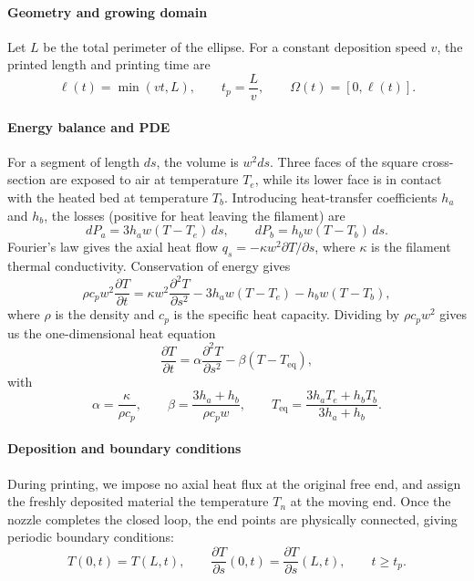 \documentclass[a4paper,12pt]{article}
\begin{document}
\paragraph{Geometry and growing domain}
Let $L$ be the total perimeter of the ellipse. For a constant deposition speed $v$, the printed length and printing time are
\begin{equation}
    \ell(t)=\min(vt,L), \qquad t_p=\frac{L}{v},
    \qquad \Omega(t)=[0,\ell(t)].
\end{equation}


\paragraph{Energy balance and PDE}
For a segment of length $ds$, the volume is $w^2ds$. Three faces of the square cross-section are exposed to air at temperature $T_e$, while its lower face is in contact with the heated bed at temperature $T_b$. Introducing heat-transfer coefficients $h_a$ and $h_b$, the losses (positive for heat leaving the filament) are
\begin{equation}
    dP_a=3h_aw(T-T_e)\,ds,
    \qquad dP_b=h_bw(T-T_b)\,ds.
\end{equation}
Fourier's law gives the axial heat flow $q_s=-\kappa w^2\partial T/\partial s$, where $\kappa$ is the filament thermal conductivity. Conservation of energy gives
\begin{equation}
    \rho c_pw^2\frac{\partial T}{\partial t}
    =\kappa w^2\frac{\partial^2T}{\partial s^2}
    -3h_aw(T-T_e)-h_bw(T-T_b),
\end{equation}
where $\rho$ is the density and $c_p$ is the specific heat capacity. Dividing by $\rho c_pw^2$ gives us the one-dimensional heat equation
\begin{equation}
\boxed{
    \frac{\partial T}{\partial t}
    =\alpha\frac{\partial^2T}{\partial s^2}
    -\beta(T-T_{\mathrm{eq}}),
}
\label{eq:q16pde}
\end{equation}
with
\begin{equation}
    \alpha=\frac{\kappa}{\rho c_p},\qquad
    \beta=\frac{3h_a+h_b}{\rho c_pw},\qquad
    T_{\mathrm{eq}}=\frac{3h_aT_e+h_bT_b}{3h_a+h_b}.
\end{equation}


\paragraph{Deposition and boundary conditions}

During printing, we impose no axial heat flux at the original free end, and assign the freshly deposited material the temperature $T_n$ at the moving end. Once the nozzle completes the closed loop, the end points are physically connected, giving periodic boundary conditions:
\begin{equation}
    T(0,t)=T(L,t),\qquad
    \frac{\partial T}{\partial s}(0,t)
    =\frac{\partial T}{\partial s}(L,t), \qquad t\ge t_p.
\end{equation}
\end{document}
